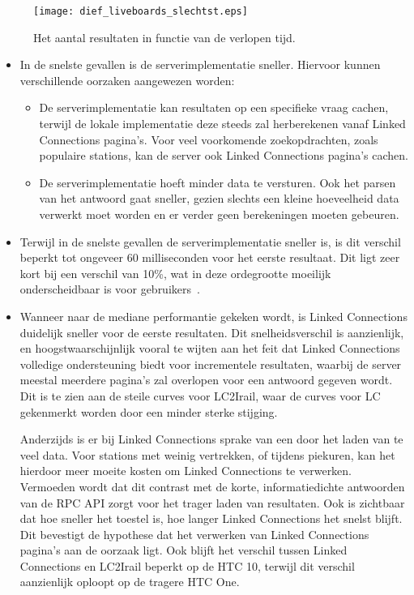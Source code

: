\begin{figure}[h]
	\centering
	\texttt{[image: dief\_liveboards\_slechtst.eps]}
	\caption[Aantal resultaten liveboards in functie van de tijd (90e percentiel)]{Het aantal resultaten in functie van de verlopen tijd.}
	\label{fig:liveboardsDiefSlechtst}
\end{figure}


\begin{itemize}
    \item In de snelste gevallen is de serverimplementatie sneller. Hiervoor kunnen verschillende oorzaken aangewezen worden: 
	\begin{itemize}
		\item De serverimplementatie kan resultaten op een specifieke vraag cachen, terwijl de lokale implementatie deze steeds zal herberekenen vanaf Linked Connections pagina's. Voor veel voorkomende zoekopdrachten, zoals populaire stations, kan de server ook Linked Connections pagina's cachen.
		\item De serverimplementatie hoeft minder data te versturen. Ook het parsen van het antwoord gaat sneller, gezien slechts een kleine hoeveelheid data verwerkt moet worden en er verder geen berekeningen moeten gebeuren.
	\end{itemize}

	\item Terwijl in de snelste gevallen de serverimplementatie sneller is, is dit verschil beperkt tot ongeveer 60 milliseconden voor het eerste resultaat. Dit ligt zeer kort bij een verschil van 10\%, wat in deze ordegrootte moeilijk onderscheidbaar is voor gebruikers~\citep{miller68}. %
	
	\item Wanneer naar de mediane performantie gekeken wordt, is Linked Connections duidelijk sneller voor de eerste resultaten. Dit snelheidsverschil is aanzienlijk, en hoogstwaarschijnlijk vooral te wijten aan het feit dat Linked Connections volledige ondersteuning biedt voor incrementele resultaten, waarbij de server meestal meerdere pagina's zal overlopen voor een  antwoord gegeven wordt. Dit is te zien aan de steile curves voor LC2Irail, waar de curves voor LC gekenmerkt worden door een minder sterke stijging. 
	
	Anderzijds is er bij Linked Connections sprake van een  door het laden van te veel data. Voor stations met weinig vertrekken, of tijdens piekuren, kan het hierdoor meer moeite kosten om Linked Connections te verwerken. Vermoeden wordt dat dit contrast met de korte, informatiedichte antwoorden van de RPC API zorgt voor het trager laden van resultaten. Ook is zichtbaar dat hoe sneller het toestel is, hoe langer Linked Connections het snelst blijft. Dit bevestigt de hypothese dat het verwerken van Linked Connections pagina's aan de oorzaak ligt. Ook blijft het verschil tussen Linked Connections en LC2Irail beperkt op de HTC 10, terwijl dit verschil aanzienlijk oploopt op de tragere HTC One.
	

\end{itemize}
